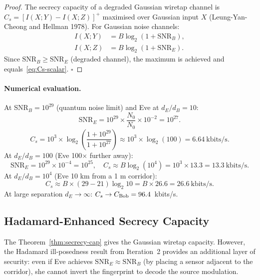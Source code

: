 \documentclass[aps,prd,twocolumn,superscriptaddress,nofootinbib]{revtex4-2}
\newcommand{\SNR}{\mathrm{SNR}}
\begin{document}
\begin{proof}
The secrecy capacity of a degraded Gaussian wiretap channel is
$C_s = [I(X;Y) - I(X;Z)]^+$ maximised over Gaussian input $X$
(Leung-Yan-Cheong and Hellman 1978). For Gaussian noise channels:
\begin{align}
I(X;Y) &= B\log_2(1 + \SNR_B), \\
I(X;Z) &= B\log_2(1 + \SNR_E).
\end{align}
Since $\SNR_B \geq \SNR_E$ (degraded channel), the maximum is achieved
and equals~\eqref{eq:Cs-scalar}. $\square$
\end{proof}

\paragraph{Numerical evaluation.}
At SNR$_B = 10^{29}$ (quantum noise limit) and Eve at $d_E/d_B = 10$:
\begin{equation}
\SNR_E = 10^{29} \times \frac{N_0}{N_0} \times 10^{-2} = 10^{27}.
\end{equation}
\begin{equation}
C_s = 10^3 \times \log_2\!\left(\frac{1 + 10^{29}}{1 + 10^{27}}\right)
\approx 10^3 \times \log_2\!\left(100\right) = 6.64~\text{kbits/s}.
\end{equation}
At $d_E/d_B = 100$ (Eve 100$\times$ further away):
\begin{equation}
\SNR_E = 10^{29} \times 10^{-4} = 10^{25}, \quad
C_s \approx B \log_2(10^4) = 10^3 \times 13.3 = 13.3~\text{kbits/s}.
\end{equation}
At $d_E/d_B = 10^4$ (Eve 10 km from a 1 m corridor):
\begin{equation}
C_s \approx B \times (29 - 21)\log_2 10 = B \times 26.6 = 26.6~\text{kbits/s}.
\end{equation}
At large separation $d_E \to \infty$: $C_s \to C_{\rm Bob} = 96.4$~kbits/s.

\subsection{Hadamard-Enhanced Secrecy Capacity}

The Theorem~\ref{thm:secrecy-cap} gives the Gaussian wiretap capacity. However,
the Hadamard ill-posedness result from Iteration~2 provides an additional
layer of security: even if Eve achieves $\SNR_E \approx \SNR_B$ (by placing a
sensor adjacent to the corridor), she cannot invert the fingerprint to
decode the source modulation.
\end{document}

